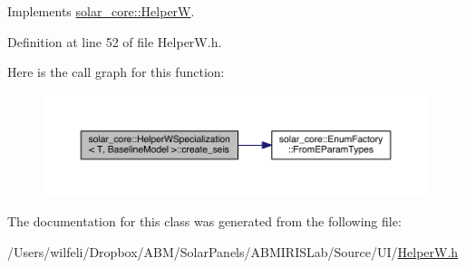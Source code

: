 Implements \hyperlink{classsolar__core_1_1_helper_w_a2d53e9a0f5945ced5ddc0388278d2336}{solar\+\_\+core\+::\+Helper\+W}.



Definition at line 52 of file Helper\+W.\+h.



Here is the call graph for this function\+:\nopagebreak
\begin{figure}[H]
\begin{center}
\leavevmode
\includegraphics[width=350pt]{classsolar__core_1_1_helper_w_specialization_3_01_t_00_01_baseline_model_01_4_a9f9f25055cdc6e402ae717b540a1feac_cgraph}
\end{center}
\end{figure}




The documentation for this class was generated from the following file\+:\begin{DoxyCompactItemize}
\item 
/\+Users/wilfeli/\+Dropbox/\+A\+B\+M/\+Solar\+Panels/\+A\+B\+M\+I\+R\+I\+S\+Lab/\+Source/\+U\+I/\hyperlink{_helper_w_8h}{Helper\+W.\+h}\end{DoxyCompactItemize}
